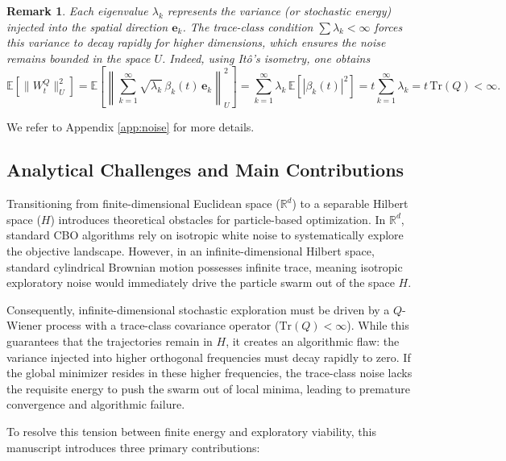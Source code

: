 \documentclass[12pt]{amsart}
\numberwithin{equation}{section}
\newtheorem{remark}[theorem]{Remark}
\begin{document}
\begin{remark}
Each eigenvalue $\lambda_k$ represents the variance (or stochastic energy) injected into the spatial direction $\mathbf{e}_k$. The trace-class condition $\sum\lambda_k<\infty$ forces this variance to decay rapidly for higher dimensions, which ensures the noise remains bounded in the space $U$. Indeed, using It\^{o}'s isometry, one obtains
\begin{equation*}
    \mathbb{E}\left[\|W_t^Q\|_U^2\right] = \mathbb{E}\left[\left\| \sum_{k=1}^\infty \sqrt{\lambda_k}\, \beta_k(t)\, \mathbf{e}_k \right\|_U^2\right] = \sum_{k=1}^\infty \lambda_k \, \mathbb{E}[|\beta_k(t)|^2] = t \sum_{k=1}^\infty \lambda_k = t\, \mathrm{Tr}(Q) < \infty.
\end{equation*}
\end{remark}

We refer to Appendix \ref{app:noise} for more details.

\subsection{Analytical Challenges and Main Contributions}

Transitioning from finite-dimensional Euclidean space ($\mathbb{R}^d$) to a separable Hilbert space ($H$) introduces theoretical obstacles for particle-based optimization. In $\mathbb{R}^d$, standard CBO algorithms rely on isotropic white noise to systematically explore the objective landscape. However, in an infinite-dimensional Hilbert space, standard cylindrical Brownian motion possesses infinite trace, meaning isotropic exploratory noise would immediately drive the particle swarm out of the space $H$. 

Consequently, infinite-dimensional stochastic exploration must be driven by a $Q$-Wiener process with a trace-class covariance operator ($\mathrm{Tr}(Q) < \infty$). While this guarantees that the trajectories remain in $H$, it creates an algorithmic flaw: the variance injected into higher orthogonal frequencies must decay rapidly to zero. If the global minimizer resides in these higher frequencies, the trace-class noise lacks the requisite energy to push the swarm out of local minima, leading to premature convergence and algorithmic failure.

To resolve this tension between finite energy and exploratory viability, this manuscript introduces three primary contributions:
\end{document}
